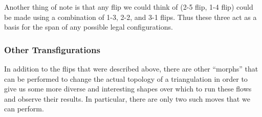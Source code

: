 \documentclass[12pt]{article}
\begin{document}
\noindent Another thing of note is that any flip we could think of (2-5 flip, 1-4 flip) could be made using a combination of 1-3, 2-2, and 3-1 flips. Thus these three act as a basis for the span of any possible legal configurations.
  

\subsubsection{Other Transfigurations}

In addition to the flips that were described above, there are other ``morphs'' that can be performed to change the actual topology of a triangulation in order to give us some more diverse and interesting shapes over which to run these flows and observe their results. In particular, there are only two such moves that we can perform.
\end{document}

